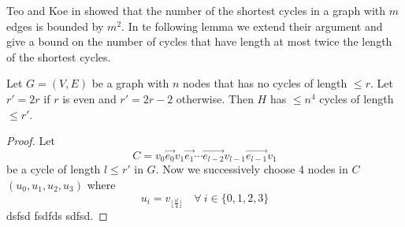 Teo and Koe in \cite{TeoKoh_1992_Tno_CONF} showed that the number of the shortest cycles in a graph with $m$ edges is bounded by $m^2$. In te following lemma we extend their argument and give a bound on the number of cycles that have length at most twice the length of the shortest cycles.
\begin{lemma}{\cite[Lemma 3.4]{FennerGurjarThierauf_2016_Bpm_CONF}}{}
	Let $G=(V,E)$ be a graph with $n$ nodes that has no cycles of length $\leq r$. Let $r'=2r$ if $r$ is even and $r'=2r-2$ otherwise. Then $H$ has $\leq n^4$ cycles of length $\leq r'$.
\end{lemma}
\begin{proof}
	Let $$C=v_0\overset{\longrightarrow}{e_0}v_1\overset{\longrightarrow}{e_1}\cdots \overset{\longrightarrow}{e_{l-2}}v_{l-1}\overset{\longrightarrow}{e_{l-1}}v_1$$be a cycle of length $l\leq r'$ in $G$. Now we successively choose 4 nodes in $C$ $(u_0,u_1,u_2,u_3)$ where $$u_i=v_{\lfloor \frac{il}4\rfloor}\quad \forall\ i\in \{0,1,2,3\}$$dsfsd fsdfds sdfsd. 
\end{proof}
